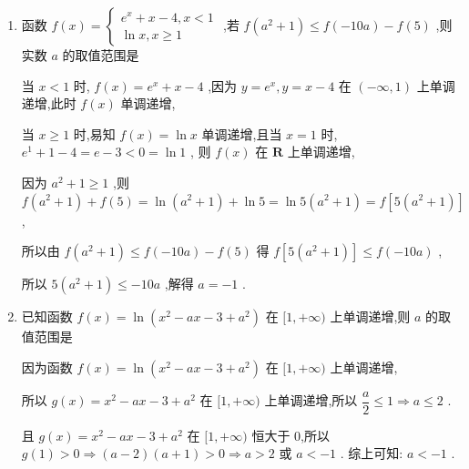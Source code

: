 \begin{enumerate}
\begin{jieda}
        则需满足 $\left\{  \begin{array}{l}  - \dfrac{-{2a}}{2 \times  \left( {-1}\right) } \geq  0 \\   - a \leq  {{e}}^{0} + \ln 1 \end{array}\right.$ ,解得 $- 1 \leq  a \leq  0$ ,
        
        即 $a$ 的范围是 $\left\lbrack  {-1,0}\right\rbrack$
    \end{jieda}
    \item 函数 $f\left( x\right)  = \left\{  \begin{array}{l} {{e}}^{x} + x - 4,x < 1 \\  \ln x,x \geq  1 \end{array}\right.$ ,若 $f\left( {{a}^{2} + 1}\right)  \leq  f\left( {-{10a}}\right)  - f\left( 5\right)$ ,则实数 $a$ 的取值范围是
    \begin{jieda}
        当 $x < 1$ 时, $f\left( x\right)  = {{e}}^{x} + x - 4$ ,因为 $y = {{e}}^{x},y = x - 4$ 在 $\left( {-\infty ,1}\right)$ 上单调递增,此时 $f\left( x\right)$ 单调递增,
        
        当 $x \geq  1$ 时,易知 $f\left( x\right)  = \ln x$ 单调递增,且当 $x = 1$ 时, ${{e}}^{1} + 1 - 4 = {e} - 3 < 0 = \ln 1$ , 则 $f\left( x\right)$ 在 $\mathbf{R}$ 上单调递增,
        
        因为 ${a}^{2} + 1 \geq  1$ ,则 $f\left( {{a}^{2} + 1}\right)  + f\left( 5\right)  = \ln \left( {{a}^{2} + 1}\right)  + \ln 5 = \ln 5\left( {{a}^{2} + 1}\right)  = f\left\lbrack  {5\left( {{a}^{2} + 1}\right) }\right\rbrack$ ,
        
        所以由 $f\left( {{a}^{2} + 1}\right)  \leq  f\left( {-{10a}}\right)  - f\left( 5\right)$ 得 $f\left\lbrack  {5\left( {{a}^{2} + 1}\right) }\right\rbrack   \leq  f\left( {-{10a}}\right)$ ,
        
        所以 $5\left( {{a}^{2} + 1}\right)  \leq   - {10a}$ ,解得 $a =  - 1$ .
    \end{jieda}
    \item 已知函数 $f\left( x\right)  = \ln \left( {{x}^{2} - {ax} - 3 + {a}^{2}}\right)$ 在 $\lbrack 1, + \infty )$ 上单调递增,则 $a$ 的取值范围是
    \begin{jieda}
        因为函数 $f\left( x\right)  = \ln \left( {{x}^{2} - {ax} - 3 + {a}^{2}}\right)$ 在 $\lbrack 1, + \infty )$ 上单调递增,
        
        所以 $g\left( x\right)  = {x}^{2} - {ax} - 3 + {a}^{2}$ 在 $\lbrack 1, + \infty )$ 上单调递增,所以 $\dfrac{a}{2} \leq  1 \Longrightarrow  a \leq  2$ .
        
        且 $g\left( x\right)  = {x}^{2} - {ax} - 3 + {a}^{2}$ 在 $\lbrack 1, + \infty )$ 恒大于 0,所以 $g\left( 1\right)  > 0 \Longrightarrow  \left( {a - 2}\right) \left( {a + 1}\right)  > 0 \Longrightarrow  a > 2$ 或 $a <  - 1$ . 综上可知: $a <  - 1$ .
    \end{jieda}
\end{enumerate}
